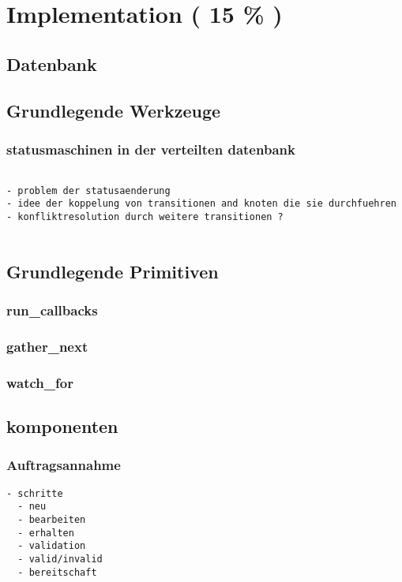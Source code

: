 \chapter{Implementation ( 15 \% ) }



\section{Datenbank}
\section{Grundlegende Werkzeuge}
\subsection{statusmaschinen in der verteilten datenbank}

\begin{verbatim}

- problem der statusaenderung
- idee der koppelung von transitionen and knoten die sie durchfuehren
- konfliktresolution durch weitere transitionen ?


\end{verbatim}
\section{Grundlegende Primitiven}

\subsection{run\_callbacks}
\subsection{gather\_next}
\subsection{watch\_for}

\section{komponenten}

\subsection{Auftragsannahme}

\begin{verbatim}
- schritte
  - neu
  - bearbeiten
  - erhalten
  - validation
  - valid/invalid
  - bereitschaft
\end{verbatim}

